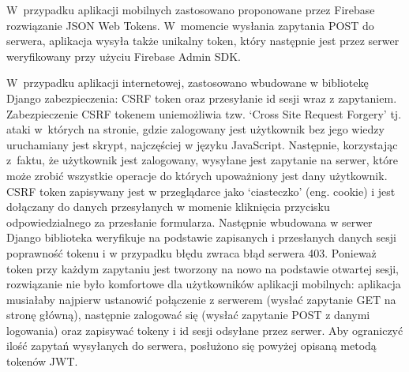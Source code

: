 W~przypadku aplikacji mobilnych zastosowano proponowane przez Firebase rozwiązanie JSON Web Tokens. W~momencie wysłania zapytania POST do serwera, aplikacja wysyła także unikalny token, który następnie jest przez serwer weryfikowany przy użyciu Firebase Admin SDK.

W~przypadku aplikacji internetowej, zastosowano wbudowane w bibliotekę Django zabezpieczenia: CSRF token oraz przesyłanie id sesji wraz z zapytaniem. Zabezpieczenie CSRF tokenem uniemożliwia tzw. `Cross Site Request Forgery' tj. ataki w~których na stronie, gdzie zalogowany jest użytkownik bez jego wiedzy uruchamiany jest skrypt, najczęściej w języku JavaScript. Następnie, korzystając z~faktu, że użytkownik jest zalogowany, wysyłane jest zapytanie na serwer, które może zrobić wszystkie operacje do których upoważniony jest dany użytkownik. CSRF token zapisywany jest w przeglądarce jako `ciasteczko' (eng. cookie) i jest dołączany do danych przesyłanych w momenie kliknięcia przycisku odpowiedzialnego za przesłanie formularza. Następnie wbudowana w serwer Django biblioteka weryfikuje na podstawie zapisanych i przesłanych danych sesji poprawność tokenu i w przypadku błędu zwraca błąd serwera 403.
Ponieważ token przy każdym zapytaniu jest tworzony na nowo na podstawie otwartej sesji, rozwiązanie nie było komfortowe dla użytkowników aplikacji mobilnych: aplikacja musiałaby najpierw ustanowić połączenie z serwerem (wysłać zapytanie GET na stronę główną), następnie zalogować się (wysłać zapytanie POST z danymi logowania) oraz zapisywać tokeny i id sesji odsyłane przez serwer. Aby ograniczyć ilość zapytań wysyłanych do serwera, posłużono się powyżej opisaną metodą tokenów JWT.
